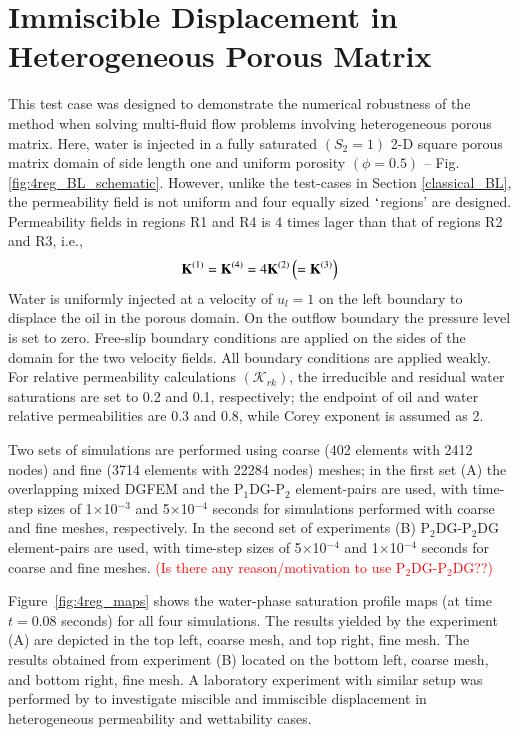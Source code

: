 \documentclass[preprint,authoryear,12pt]{elsarticle}
\newcommand{\PN}[2][error]{P$_{#1}$DG-P$_{#2}$}
\begin{document}
\section{Immiscible Displacement in Heterogeneous Porous Matrix}\label{res2}
This test case was designed to demonstrate the numerical robustness of the method when solving multi-fluid flow problems involving heterogeneous porous matrix.  Here, water is injected in a fully saturated $\left(S_{2}=1\right)$ 2-D square porous matrix domain of side length one and uniform porosity $\left(\phi=0.5\right)$ -- Fig. \ref{fig:4reg_BL_schematic}. However, unlike the test-cases in Section \ref{classical_BL}, the permeability field is not uniform and four equally sized $\lq$regions' are designed.  Permeability fields in regions R1 and R4 is 4 times lager than that of regions R2 and R3, i.e.,
\begin{displaymath}
\mathbf{K}^{\text(1)}=\mathbf{K}^{\text(4)}=4\mathbf{K}^{\text(2)}\left(=\mathbf{K}^{\text{(3)}}\right)
\end{displaymath}
Water is uniformly injected at a velocity of $u_{l}=1$ on the left boundary to displace the oil in the porous domain. On the outflow boundary the pressure level is set to zero. Free-slip boundary conditions are applied on the sides of the domain for the two velocity fields. All boundary conditions are applied weakly. For relative permeability calculations $\left(\mathcal{K}_{rk}\right)$, the irreducible and residual water saturations are set to 0.2 and 0.1, respectively; the endpoint of oil and water relative permeabilities are 0.3 and 0.8, while Corey exponent is assumed as 2.

Two sets of simulations are performed using coarse (402 elements with 2412 nodes) and fine (3714 elements with 22284 nodes) meshes; in the first set (A) the overlapping mixed DGFEM and the \PN[1]{2} element-pairs are used, with time-step sizes of 1$\times$10$^{-3}$ and 5$\times$10$^{-4}$ seconds for simulations performed with coarse and fine meshes, respectively. In the second set of experiments (B) \PN[2]{2}DG element-pairs are used, with time-step sizes of 5$\times$10$^{-4}$ and 1$\times$10$^{-4}$ seconds for coarse and fine meshes. \textcolor{red}{(Is there any reason/motivation to use \PN[2]{2}DG??)}

Figure~\ref{fig:4reg_maps} shows the water-phase saturation profile maps (at time $t=0.08$ seconds) for all four simulations. The results yielded by the experiment (A) are depicted in the top left, coarse mesh, and top right, fine mesh. The results obtained from experiment (B) located on the bottom left, coarse mesh, and bottom right, fine mesh. A laboratory experiment with similar setup was performed by \citet{dawe_2008} to investigate miscible and immiscible displacement in heterogeneous permeability and wettability cases. 
\end{document}
